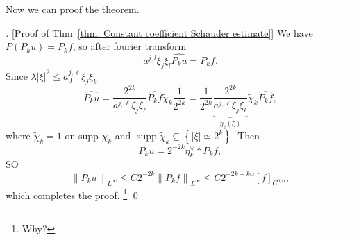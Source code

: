 Now we can proof the theorem. 
\vspace{2em}
\begin{proof}[][Proof of Thm~\ref{thm: Constant coefficient Schauder estimate}]
    We have $P(P_k u) = P_k f$, so after fourier transform
    \[
        a^{j,l} \xi_j \xi_l \widehat{P_k u} = \widehat{P_k f}.
    \]
    Since $\lambda|\xi|^{2} \leq a_{0}^{j, \ell} \xi_{j} \xi_{k}$
$$
\widehat{P_{k} u}=\frac{2^{2 k}}{a^{j, \ell} \xi_{j} \xi_{\ell}} \widehat{P_{k} f} \widetilde{\chi}_{k} \frac{1}{2^{2 k}}=\frac{1}{2^{2 k}} \underbrace{\frac{2^{2 k}}{a^{j, \ell} \xi_{j} \xi_{\ell}}}_{\eta_{k}(\xi)} \tilde{\chi}_{k} \widehat{P_{k} f},
$$
where $\widetilde{\chi}_{k}=1$ on supp $\chi_{k}$ and $\operatorname{supp} \widetilde{\chi}_{k} \subseteq\left\{|\xi| \simeq 2^{k}\right\}$. Then
$$
P_{k} u=2^{-2 k} \eta_{k}^{\vee} * P_{k} f,
$$
SO
$$
\left\|P_{k} u\right\|_{L^{\infty}} \leq C 2^{-2 k}\left\|P_{k} f\right\|_{L^{\infty}} \leq C 2^{-2 k- k\alpha}[f]_{C^{0,\alpha}},
$$
which completes the proof. \footnote{Why?}
\qed
\end{proof}


